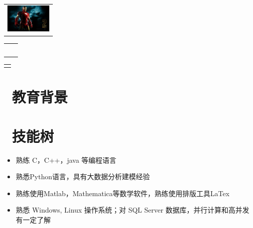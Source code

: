 \documentclass[14pt]{resume}
\begin{document}

\begin{multicols}{4}
    \Large{
        \begin{tabu}{ r }
        \end{tabu}
    }
    \columnbreak
    \Large{
        \begin{tabu}{ l l }
            &  \\
            &  \\
            &  \\   %
            &  
		\\
		\\
        \end{tabu}
    }
    \columnbreak
    \Large{
        \begin{tabu}{ r }
        \end{tabu}
    }
\end{multicols}

\section{\faGraduationCap\  教育背景}

\section{\faCogs\ 技能树}

\begin{itemize}
    \item[\faTree] 熟练 C，C++，java 等编程语言
    \item[\faTree] 熟悉Python语言，具有大数据分析建模经验
    \item[\faTree] 熟练使用Matlab，Mathematica等数学软件，熟练使用排版工具LaTex
    \item[\faTree] 熟悉 Windows, Linux 操作系统；对 SQL Server 数据库，并行计算和高并发有一定了解
\end{itemize}
\end{document}
